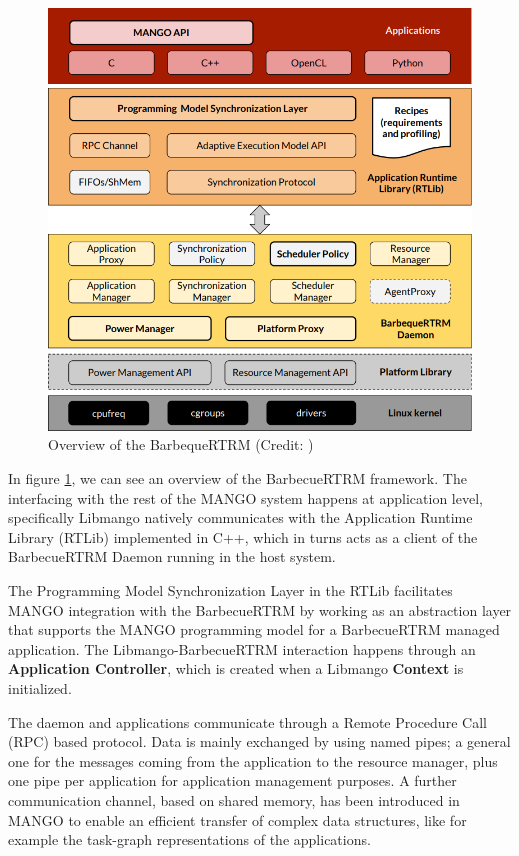 \begin{figure}[ht]
    \centering
    \includegraphics[width=\textwidth]{img/barbecue-arch.png}
    \captionsetup{justification=centering}
    \caption{Overview of the BarbequeRTRM (Credit: \cite{mango_exploring_manycore_architectures})}
    \label{fig:barbecue-arch}
\end{figure}

In figure \ref{fig:barbecue-arch}, we can see an overview of the BarbecueRTRM framework. The interfacing with the rest of the MANGO system happens at application level, specifically Libmango natively communicates with the Application Runtime Library (RTLib) implemented in C++, which in turns acts as a client of the BarbecueRTRM Daemon running in the host system.

The Programming Model Synchronization Layer in the RTLib facilitates MANGO integration with the BarbecueRTRM by working as an abstraction layer that supports the MANGO programming model for a BarbecueRTRM managed application.
The Libmango-BarbecueRTRM interaction happens through an \textbf{Application Controller}, which is created when a Libmango \textbf{Context} is initialized.

The daemon and applications communicate through a Remote Procedure Call (RPC) based protocol. Data is mainly exchanged by using named pipes; a general one for the messages coming from the application to the resource manager, plus one pipe per application for application management purposes. A further communication channel, based on shared memory, has been introduced in MANGO to enable an efficient transfer of complex data structures, like for example the task-graph representations of the applications. 

